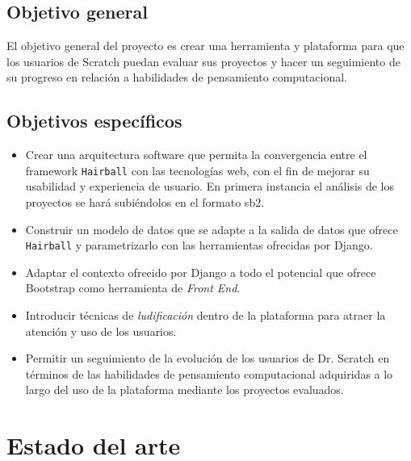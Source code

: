 \documentclass[a4paper, 12pt]{book}
\begin{document}
\section{Objetivo general}
\label{sec:objetivo-general}

El objetivo general del proyecto es crear una herramienta y plataforma para que los
usuarios de Scratch puedan evaluar sus proyectos y hacer un seguimiento de su progreso
en relación a habilidades de pensamiento computacional.


\section{Objetivos específicos}
\label{sec:objetivos-especificos}

\begin{itemize}
  \item Crear una arquitectura software que permita la convergencia entre el framework 
	\texttt{Hairball} con las tecnologías web, con el fin de mejorar su usabilidad y 
	experiencia de usuario. En 	primera instancia el análisis de los proyectos se hará 
	subiéndolos en el formato sb2.
  \item Construir un modelo de datos que se adapte a la salida de datos que ofrece 
	\texttt{Hairball} y parametrizarlo con las herramientas ofrecidas por Django.
  \item Adaptar el contexto ofrecido por Django a todo el potencial que ofrece Bootstrap 
	como herramienta de \emph{Front End}.
  \item Introducir técnicas de \emph{ludificación} dentro de la plataforma para atraer 
	la atención y uso de los usuarios.
	\item Permitir un seguimiento de la evolución de los usuarios de Dr. Scratch en 
	términos de las habilidades de pensamiento computacional adquiridas a lo largo del 
	uso de la plataforma mediante los proyectos evaluados.
\end{itemize}



\cleardoublepage
\chapter{Estado del arte}
\end{document}
